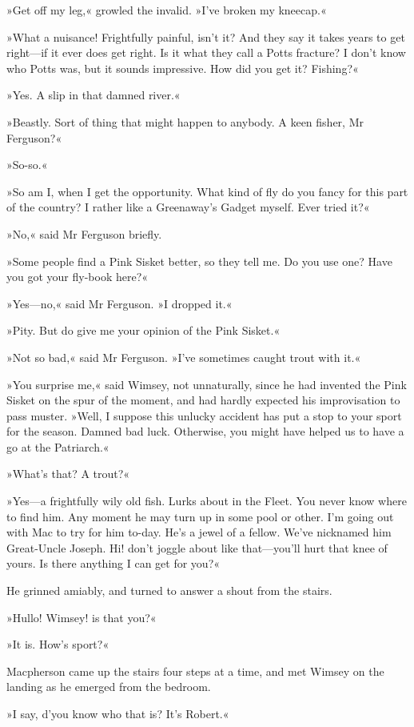 »Get off my leg,« growled the invalid. »I've broken my kneecap.«

»What a nuisance! Frightfully painful, isn't it? And they say it takes years to get right—if it ever does get right. Is it what they call a Potts fracture? I don't know who Potts was, but it sounds impressive. How did you get it? Fishing?«

»Yes. A slip in that damned river.«

»Beastly. Sort of thing that might happen to anybody. A keen fisher, Mr Ferguson?«

»So-so.«

»So am I, when I get the opportunity. What kind of fly do you fancy for this part of the country? I rather like a Greenaway's Gadget myself. Ever tried it?«

»No,« said Mr Ferguson briefly.

»Some people find a Pink Sisket better, so they tell me. Do you use one? Have you got your fly-book here?«

»Yes—no,« said Mr Ferguson. »I dropped it.«

»Pity. But do give me your opinion of the Pink Sisket.«

»Not so bad,« said Mr Ferguson. »I've sometimes caught trout with it.«

»You surprise me,« said Wimsey, not unnaturally, since he had invented the Pink Sisket on the spur of the moment, and had hardly expected his improvisation to pass muster. »Well, I suppose this unlucky accident has put a stop to your sport for the season. Damned bad luck. Otherwise, you might have helped us to have a go at the Patriarch.«

»What's that? A trout?«

»Yes—a frightfully wily old fish. Lurks about in the Fleet. You never know where to find him. Any moment he may turn up in some pool or other. I'm going out with Mac to try for him to-day. He's a jewel of a fellow. We've nicknamed him Great-Uncle Joseph. Hi! don't joggle about like that—you'll hurt that knee of yours. Is there anything I can get for you?«

He grinned amiably, and turned to answer a shout from the stairs.

»Hullo! Wimsey! is that you?«

»It is. How's sport?«

Macpherson came up the stairs four steps at a time, and met Wimsey on the landing as he emerged from the bedroom.

»I say, d'you know who that is? It's Robert.«

